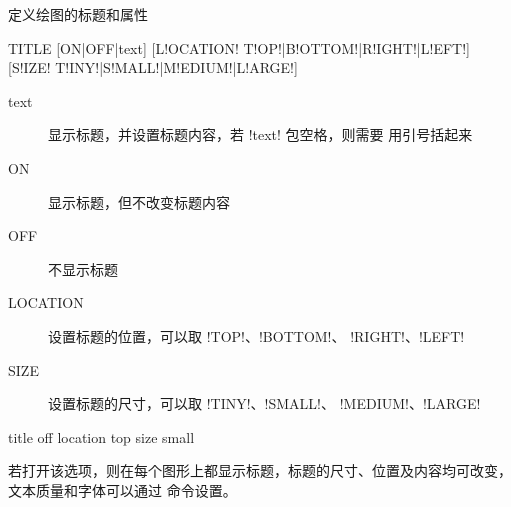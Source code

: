 \label{cmd:title}

定义绘图的标题和属性

\begin{SACSTX}
TITLE [ON|OFF|text] [L!OCATION! T!OP!|B!OTTOM!|R!IGHT!|L!EFT!]
    [S!IZE! T!INY!|S!MALL!|M!EDIUM!|L!ARGE!]
\end{SACSTX}

\begin{description}
\item [text] 显示标题，并设置标题内容，若 !text! 包空格，则需要
    用引号括起来
\item [ON] 显示标题，但不改变标题内容
\item [OFF] 不显示标题
\item [LOCATION] 设置标题的位置，可以取 !TOP!、!BOTTOM!、
    !RIGHT!、!LEFT!
\item [SIZE] 设置标题的尺寸，可以取 !TINY!、!SMALL!、
    !MEDIUM!、!LARGE!
\end{description}

\begin{SACDFT}
title off location top size small
\end{SACDFT}

若打开该选项，则在每个图形上都显示标题，标题的尺寸、位置及内容均可改变，
文本质量和字体可以通过  命令设置。
